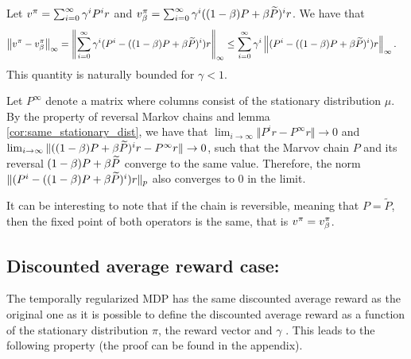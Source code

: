 
\begin{proposition}
Let $v^{\pi} = \sum_{i=0}^{\infty} \gamma^i P^i r$ and $v^{\pi}_{\beta} = \sum_{i=0}^{\infty} \gamma^i ((1-\beta) P + \beta \widetilde{P})^i r$. We have that
\begin{equation}
    \begin{split}
        \left\lVert v^{\pi} - v^{\pi}_{\beta}\right\rVert_{\infty} &= \left\lVert\sum_{i=0}^{\infty} \gamma^i (P^i-((1-\beta) P + \beta \widetilde{P})^i) r\right\rVert_{\infty}
        \leq \sum_{i=0}^{\infty} \gamma^i \left\lVert (P^i-((1-\beta) P + \beta \widetilde{P})^i) r\right\rVert_{\infty}.
    \end{split}
\end{equation}
This quantity is naturally bounded for $\gamma < 1$.
\end{proposition}
\begin{remark}
Let $P^\infty$ denote a matrix where columns consist of the stationary distribution $\mu$.
By the property of reversal Markov chains and lemma \ref{cor:same_stationary_dist}, we have that $\lim_{i\rightarrow\infty} \Vert P^i r-P^\infty r \Vert \rightarrow 0$ and $\lim_{i\rightarrow\infty} \Vert ((1-\beta)P+\beta \widetilde{P})^i r-P^\infty r \Vert \rightarrow 0$, such that the Marvov chain $P$ and its reversal $(1-\beta)P+\beta \widetilde{P}$ converge to the same value. Therefore, the norm $\Vert  (P^i-((1-\beta) P + \beta \widetilde{P})^i) r \Vert_p$ also converges to 0 in the limit.
\end{remark}

\begin{remark}
It can be interesting to note that if the chain is reversible, meaning that $P = \widetilde{P}$, then the fixed point of both operators is the same, that is $v^\pi = v_\beta^\pi$.
\end{remark}

\subsection{Discounted average reward case:} The temporally regularized MDP has the same discounted average reward as the original one as it is possible to define the discounted average reward \cite{tsitsiklis2002average} as a function of the stationary distribution $\pi$, the reward vector and $\gamma$ . This leads to the following property (the proof can be found in the appendix).

